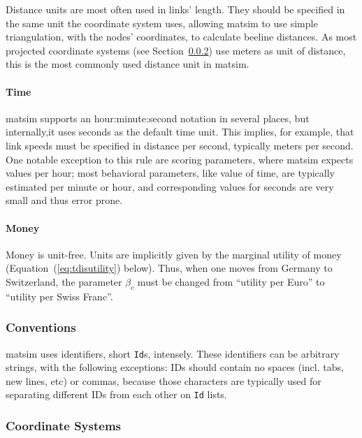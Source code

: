 Distance units are most often used in links' length. They should be specified in the same unit the coordinate system uses, allowing \gls{matsim} to use simple triangulation, \eg with the nodes' coordinates, to calculate beeline distances. As most projected coordinate systems (see Section~\ref{sec:coordinatesystems}) use meters as unit of distance, this is the most commonly used distance unit in \gls{matsim}. 

\paragraph{Time}

 \gls{matsim} supports an hour:minute:second notation in several places, but internally,it uses seconds as the default time unit. This implies, for example, that link speeds must be specified in distance per second, typically meters per second. One notable exception to this rule are scoring parameters, where \gls{matsim} expects values per hour; most behavioral parameters, like value of time, are typically estimated per minute or hour, and corresponding values for seconds are very small and thus error prone. 

\paragraph{Money}

Money is unit-free. Units are implicitly given by the marginal utility of money (\cf Equation~(\ref{eq:tdisutility}) below). Thus, when one moves from Germany to Switzerland, the parameter $\beta_c$ must be changed from ``utility per Euro'' to ``utility per Swiss Franc''.

\subsubsection{Conventions}
\gls{matsim} uses identifiers, short \lstinline|Id|s, intensely. These identifiers can be arbitrary strings, with the following exceptions: IDs should contain no spaces (incl. tabs, new lines, etc) or commas, because those characters are typically used for separating different IDs from each other on \lstinline|Id| lists. 

\subsubsection{Coordinate Systems}
\label{sec:coordinatesystems}
